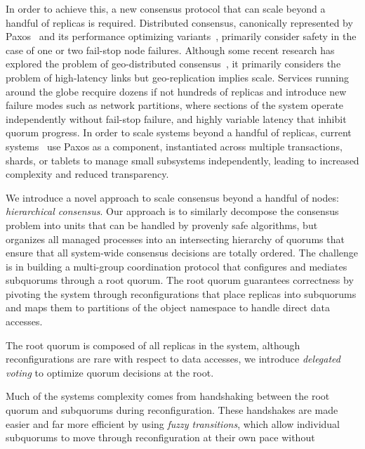 \documentclass[11pt,conference]{IEEEtran}
\newcommand{\hc}{hierarchical consensus\xspace}
\newcommand{\subs}{subquorums\xspace}
\newcommand{\roo}{root quorum\xspace}
\begin{document}
In order to achieve this, a new consensus protocol that can scale beyond a handful of
replicas is required.
Distributed consensus, canonically represented by Paxos~\cite{paxos_simple} and its
performance optimizing
variants~\cite{fast_paxos,multicoordinated_paxos,spaxos,generalized_paxos}, primarily
consider safety in the case of one or two fail-stop node failures.
Although some recent research has explored the problem of geo-distributed
consensus~\cite{mencius,epaxos}, it primarily considers the problem of high-latency
links but geo-replication implies scale.
Services running around the globe recquire dozens if not hundreds of replicas and
introduce new failure modes such as network partitions, where sections of the system
operate independently without fail-stop failure, and highly variable latency that
inhibit quorum progress.
In order to scale systems beyond a handful of replicas, current
systems~\cite{spanner,scatter,mdcc,calvinfs} use Paxos as a component, instantiated
across multiple transactions, shards, or tablets to manage small subsystems
independently, leading to increased complexity and reduced transparency.

We introduce a novel approach to scale consensus beyond a handful of nodes:
\emph{\hc}.
Our approach is to similarly decompose the consensus problem into units that can be
handled by provenly safe algorithms, but organizes all managed processes into an
intersecting hierarchy of quorums that ensure that all system-wide consensus decisions
are totally ordered.
The challenge is in building a multi-group coordination protocol that configures and
mediates \subs through a \roo.
The \roo guarantees correctness by pivoting the system through reconfigurations that
place replicas into \subs and maps them to partitions of the object namespace to handle
direct data accesses.




The \roo is composed of all replicas in the system, although reconfigurations are rare
with respect to data accesses, we introduce \emph{delegated voting} to optimize quorum
decisions at the root.

Much of the systems complexity comes from handshaking between the \roo and \subs during
reconfiguration.
These handshakes are made easier and far more efficient by using \emph{fuzzy transitions},
which allow individual \subs to move through reconfiguration at their own pace without
\end{document}
